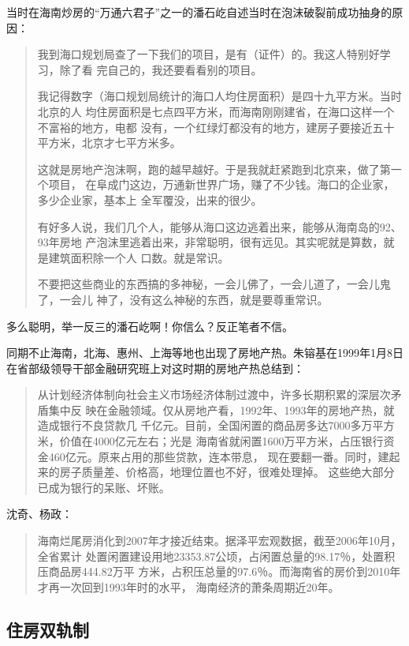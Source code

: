 当时在海南炒房的“万通六君子”之一的潘石屹自述当时在泡沫破裂前成功抽身的原因：
\begin{quotation}
  我到海口规划局查了一下我们的项目，是有（证件）的。我这人特别好学习，除了看
  完自己的，我还要看看别的项目。

  我记得数字（海口规划局统计的海口人均住房面积）是四十九平方米。当时北京的人
  均住房面积是七点四平方米，而海南刚刚建省，在海口这样一个不富裕的地方，电都
  没有，一个红绿灯都没有的地方，建房子要接近五十平方米，北京才七平方米多。

  这就是房地产泡沫啊，跑的越早越好。于是我就赶紧跑到北京来，做了第一个项目，
  在阜成门这边，万通新世界广场，赚了不少钱。海口的企业家，多少企业家，基本上
  全军覆没，出来的很少。

  有好多人说，我们几个人，能够从海口这边逃着出来，能够从海南岛的92、93年房地
  产泡沫里逃着出来，非常聪明，很有远见。其实呢就是算数，就是建筑面积除一个人
  口数。就是常识。

  不要把这些商业的东西搞的多神秘，一会儿佛了，一会儿道了，一会儿鬼了，一会儿
  神了，没有这么神秘的东西，就是要尊重常识。
\end{quotation}
多么聪明，举一反三的潘石屹啊！你信么？反正笔者不信。


同期不止海南，北海、惠州、上海等地也出现了房地产热。朱镕基在1999年1月8日
在省部级领导干部金融研究班上对这时期的房地产热总结到：
\begin{quotation}
  从计划经济体制向社会主义市场经济体制过渡中，许多长期积累的深层次矛盾集中反
  映在金融领域。仅从房地产看，1992年、1993年的房地产热，就造成银行不良贷款几
  千亿元。目前，全国闲置的商品房多达7000多万平方米，价值在4000亿元左右；光是
  海南省就闲置1600万平方米，占压银行资金460亿元。原来占用的那些贷款，连本带息，
  现在要翻一番。同时，建起来的房子质量差、价格高，地理位置也不好，很难处理掉。
  这些绝大部分已成为银行的呆账、坏账。
\end{quotation}

沈奇、杨政：
\begin{quotation}
  海南烂尾房消化到2007年才接近结束。据泽平宏观数据，截至2006年10月，全省累计
  处置闲置建设用地23353.87公顷，占闲置总量的98.17％，处置积压商品房444.82万平
  方米，占积压总量的97.6％。而海南省的房价到2010年才再一次回到1993年时的水平，
  海南经济的萧条周期近20年。
\end{quotation}


\subsection{住房双轨制}
\label{sec:tudijnrong}


